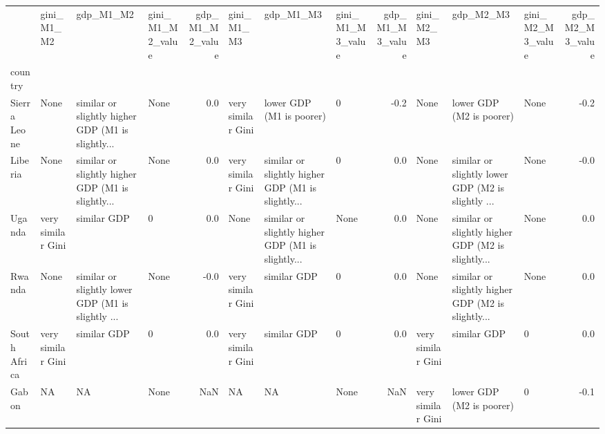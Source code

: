 \begin{tabular}{llllrlllrlllr}
\toprule
{} &         gini\_M1\_M2 &                                          gdp\_M1\_M2 & gini\_M1\_M2\_value &  gdp\_M1\_M2\_value &         gini\_M1\_M3 &                                          gdp\_M1\_M3 & gini\_M1\_M3\_value &  gdp\_M1\_M3\_value &         gini\_M2\_M3 &                                          gdp\_M2\_M3 & gini\_M2\_M3\_value &  gdp\_M2\_M3\_value \\
country      &                    &                                                    &                  &                  &                    &                                                    &                  &                  &                    &                                                    &                  &                  \\
\midrule
Sierra Leone &               None &  similar or slightly higher GDP (M1 is slightly... &             None &              0.0 &  very similar Gini &                           lower GDP (M1 is poorer) &                0 &             -0.2 &               None &                           lower GDP (M2 is poorer) &             None &             -0.2 \\
Liberia      &               None &  similar or slightly higher GDP (M1 is slightly... &             None &              0.0 &  very similar Gini &  similar or slightly higher GDP (M1 is slightly... &                0 &              0.0 &               None &  similar or slightly lower GDP (M2 is slightly ... &             None &             -0.0 \\
Uganda       &  very similar Gini &                                        similar GDP &                0 &              0.0 &               None &  similar or slightly higher GDP (M1 is slightly... &             None &              0.0 &               None &  similar or slightly higher GDP (M2 is slightly... &             None &              0.0 \\
Rwanda       &               None &  similar or slightly lower GDP (M1 is slightly ... &             None &             -0.0 &  very similar Gini &                                        similar GDP &                0 &              0.0 &               None &  similar or slightly higher GDP (M2 is slightly... &             None &              0.0 \\
South Africa &  very similar Gini &                                        similar GDP &                0 &              0.0 &  very similar Gini &                                        similar GDP &                0 &              0.0 &  very similar Gini &                                        similar GDP &                0 &              0.0 \\
Gabon        &                 NA &                                                 NA &             None &              NaN &                 NA &                                                 NA &             None &              NaN &  very similar Gini &                           lower GDP (M2 is poorer) &                0 &             -0.1 \\
\bottomrule
\end{tabular}
